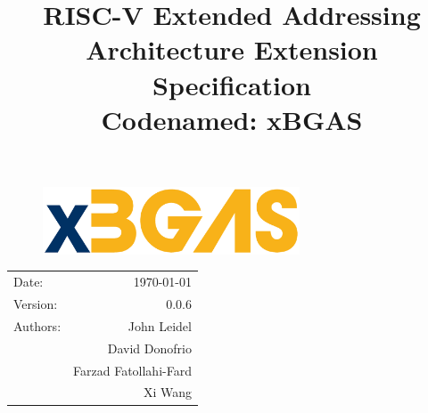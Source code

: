\documentclass{article}
\title{\textbf{RISC-V Extended Addressing\\Architecture Extension Specification\\Codenamed: xBGAS}} %
\date{} %
\begin{document}
\begin{figure}
\vspace{2in}
\begin{center}
\includegraphics[width=3in]{figures/xbgas.pdf} %
\end{center}
\end{figure}

\maketitle %

\thispagestyle{fancy}

\begin{center}
\begin{tabular}{l r}
Date: & \today \\
Version: & 0.0.6 \\ %
Authors: & John Leidel\\
& David Donofrio\\
& Farzad Fatollahi-Fard\\
& Xi Wang
\end{tabular}
\end{center}

\clearpage

\tableofcontents

\clearpage




\clearpage
\listoffigures
\listoftables
\clearpage

\clearpage
\end{document}
